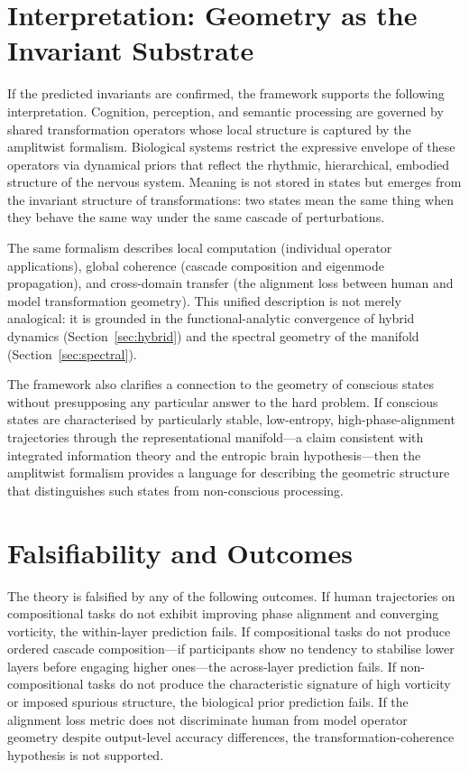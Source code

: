 \documentclass[12pt, a4paper]{article}
\theoremstyle{remark}
\theoremstyle{definition}
\begin{document}
\section{Interpretation: Geometry as the Invariant Substrate}
\label{sec:interpretation}

If the predicted invariants are confirmed, the framework supports the following
interpretation.  Cognition, perception, and semantic processing are governed by shared
transformation operators whose local structure is captured by the amplitwist formalism.
Biological systems restrict the expressive envelope of these operators via dynamical priors
that reflect the rhythmic, hierarchical, embodied structure of the nervous system.  Meaning
is not stored in states but emerges from the invariant structure of transformations: two
states mean the same thing when they behave the same way under the same cascade of
perturbations.

The same formalism describes local computation (individual operator applications), global
coherence (cascade composition and eigenmode propagation), and cross-domain transfer (the
alignment loss between human and model transformation geometry).  This unified description
is not merely analogical: it is grounded in the functional-analytic convergence of hybrid
dynamics (Section~\ref{sec:hybrid}) and the spectral geometry of the manifold
(Section~\ref{sec:spectral}).

The framework also clarifies a connection to the geometry of conscious states without
presupposing any particular answer to the hard problem.  If conscious states are
characterised by particularly stable, low-entropy, high-phase-alignment trajectories
through the representational manifold---a claim consistent with integrated information
theory and the entropic brain hypothesis---then the amplitwist formalism provides a
language for describing the geometric structure that distinguishes such states from
non-conscious processing.

\section{Falsifiability and Outcomes}
\label{sec:falsifiability}

The theory is falsified by any of the following outcomes.  If human trajectories on
compositional tasks do not exhibit improving phase alignment and converging vorticity, the
within-layer prediction fails.  If compositional tasks do not produce ordered cascade
composition---if participants show no tendency to stabilise lower layers before engaging
higher ones---the across-layer prediction fails.  If non-compositional tasks do not produce
the characteristic signature of high vorticity or imposed spurious structure, the
biological prior prediction fails.  If the alignment loss metric does not discriminate
human from model operator geometry despite output-level accuracy differences, the
transformation-coherence hypothesis is not supported.
\end{document}
